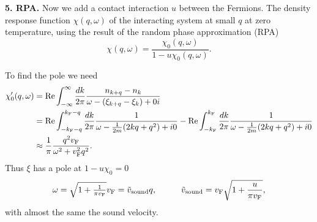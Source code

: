 \textbf{5. RPA.} Now we add a contact interaction $u$ between the Fermions. The density response function $\chi(q, \omega)$ of the interacting system at small $q$ at zero temperature, using the result of the random phase approximation (RPA)
\begin{equation*}
	\chi(q, \omega) = \frac{\chi_0(q, \omega)}{1 - u \chi_0 (q, \omega)}.
\end{equation*}


To find the pole we need
\begin{align*}
	\chi_0' (q, \omega) &= \mathop{\mathrm{Re}}\nolimits \int_{-\infty}^{\infty} \frac{dk}{2\pi} \frac{n_{k+q} - n_k}{\omega - ( \xi_{k+q} - \xi_k) + 0 i} 
	\\ &= 
	\mathop{\mathrm{Re}}\nolimits \int_{-k_{\textnormal{F}} - q}^{k_{\textnormal{F}} - q} \frac{dk}{2\pi} \frac{1}{\omega - \frac{1}{2m} (2 k q + q^2) + i0} - 
	\mathop{\mathrm{Re}}\nolimits  \int_{-k_{\textnormal{F}}}^{k_{\textnormal{F}}} \frac{dk}{2\pi} \frac{1}{\omega - \frac{1}{2m} (2 k q + q^2) + i0}
	\\ &\approx \frac{1}{\pi} \frac{q^2 v_{\textnormal{F}}}{\omega^2 + v_{\textnormal{F}}^2 q^2}.
\end{align*}
Thus $\xi$ has a pole at $1 - u \chi_0 = 0$ 
\begin{equation*}
	\omega = \sqrt{1+ \tfrac{1}{\pi \vF}} \vF = \sub{\tilde{v}}{sound} q,
	\hspace{10 mm} 
	\sub{\tilde{v}}{sound} = \vF \sqrt{1 + \frac{u}{\pi \vF}},
\end{equation*}
with almost the same the sound velocity.